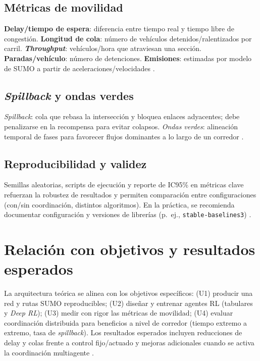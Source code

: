\subsection*{Métricas de movilidad}
\textbf{Delay/tiempo de espera}: diferencia entre tiempo real y tiempo libre de congestión. \textbf{Longitud de cola}: número de vehículos detenidos/ralentizados por carril. \textbf{\textit{Throughput}}: vehículos/hora que atraviesan una sección. \textbf{Paradas/vehículo}: número de detenciones. \textbf{Emisiones}: estimadas por modelo de SUMO a partir de aceleraciones/velocidades \citep{FHWA_Timing_Manual_Chapter3,FHWA_Toolbox_Definitions,SUMO_Emissions,HCM2000_or_2010}.

\subsection*{\textit{Spillback} y ondas verdes}
\textit{Spillback}: cola que rebasa la intersección y bloquea enlaces adyacentes; debe penalizarse en la recompensa para evitar colapsos. \textit{Ondas verdes}: alineación temporal de fases para favorecer flujos dominantes a lo largo de un corredor \citep{FHWA_Timing_Manual_Chapter3,HCM2000_or_2010}.

\subsection*{Reproducibilidad y validez}
Semillas aleatorias, scripts de ejecución y reporte de IC95\% en métricas clave refuerzan la robustez de resultados y permiten comparación entre configuraciones (con/sin coordinación, distintos algoritmos). En la práctica, se recomienda documentar configuración y versiones de librerías (p.~ej., \texttt{stable-baselines3}) \citep{SB3_Docs}.

\section{Relación con objetivos y resultados esperados}

La arquitectura teórica se alinea con los objetivos específicos: (U1) producir una red y rutas SUMO reproducibles; (U2) diseñar y entrenar agentes RL (tabulares y \textit{Deep RL}); (U3) medir con rigor las métricas de movilidad; (U4) evaluar coordinación distribuida para beneficios a nivel de corredor (tiempo extremo a extremo, tasa de \textit{spillback}). Los resultados esperados incluyen reducciones de delay y colas frente a control fijo/actuado y mejoras adicionales cuando se activa la coordinación multiagente \citep{FHWA_Timing_Manual_Chapter3,HCM2000_or_2010,Yu2021_MAPPO}.
